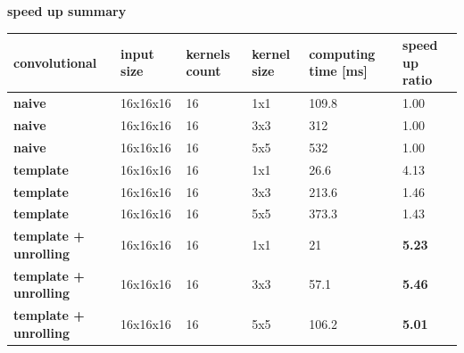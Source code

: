 \documentclass[xcolor=dvipsnames]{beamer}
\begin{document}
  \begin{frame}{\bf speed up summary}

  \begin{table}[]
    \tiny
    \begin{tabular}{|l|l|l|l|l|l|}
    \hline
    \textbf{convolutional}                               & \textbf{input size} & \textbf{kernels count} & \textbf{kernel size} & \textbf{computing time {[}ms{]}} & \textbf{speed up ratio} \\ \hline
    {\color[HTML]{9AFF99} \textbf{naive}}                & 16x16x16            & 16                     & 1x1                  & 109.8                            & 1.00                    \\ \hline
    {\color[HTML]{9AFF99} \textbf{naive}}                & 16x16x16            & 16                     & 3x3                  & 312                              & 1.00                    \\ \hline
    {\color[HTML]{9AFF99} \textbf{naive}}                & 16x16x16            & 16                     & 5x5                  & 532                              & 1.00                    \\ \hline
    {\color[HTML]{96FFFB} \textbf{template}}             & 16x16x16            & 16                     & 1x1                  & 26.6                             & 4.13                    \\ \hline
    {\color[HTML]{96FFFB} \textbf{template}}             & 16x16x16            & 16                     & 3x3                  & 213.6                            & 1.46                    \\ \hline
    {\color[HTML]{96FFFB} \textbf{template}}             & 16x16x16            & 16                     & 5x5                  & 373.3                            & 1.43                    \\ \hline
    {\color[HTML]{FD6864} \textbf{template + unrolling}} & 16x16x16            & 16                     & 1x1                  & 21                               & \textbf{5.23}           \\ \hline
    {\color[HTML]{FD6864} \textbf{template + unrolling}} & 16x16x16            & 16                     & 3x3                  & 57.1                             & \textbf{5.46}           \\ \hline
    {\color[HTML]{FD6864} \textbf{template + unrolling}} & 16x16x16            & 16                     & 5x5                  & 106.2                            & \textbf{5.01}           \\ \hline
    \end{tabular}
  \end{table}

\end{frame}
\end{document}
